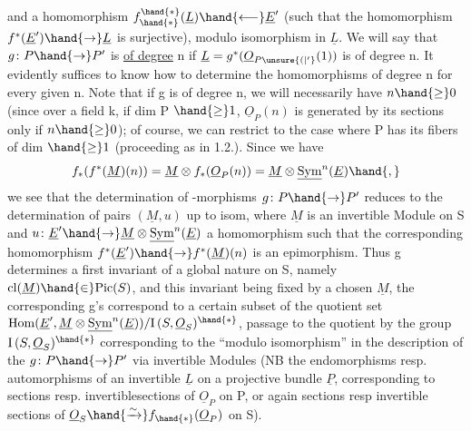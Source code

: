 
and a homomorphism $f^{\hand{*}}_{\hand{*}}(\underline{L}) \hand{\longleftarrow} \underline{E}'$ (such that the  homomorphism
$f^{*}(\underline{E}') \hand{\to} \underline{L}$ is surjective), modulo isomorphism in $\underline{L}$. We will say that
$g\colon P \hand{\to} P'$ is \uline{of degree} n if $\underline{L} = g^{*}(\underline{O}_{P\unsure{(|'}}(1))$ is of degree n. It evidently
suffices to know how to determine the homomorphisms of degree n for every given
n. Note that if g is of degree n, we will necessarily have $n \hand{\geq} 0$
(since over a field k,  if dim P $\hand{\geq} 1$, $\underline{O}_P(n)$ is generated by its
sections only if $n \hand{\geq} 0$); of course, we can  restrict to the case
where P has its fibers of dim $\hand{\geq} 1$ (proceeding as in 1.2.). Since we have
\[ f_{*}(f^{*}(\underline{M})(n)) = \underline{M} \otimes f_{*}(\underline{O}_P(n)) = \underline{M} \otimes \underline{\mathrm{Sym}}^{n}(\underline{E}) \hand{,} \]
we see that the determination of -morphisms $g\colon P \hand{\to} P'$ reduces
to the determination of pairs $(\underline{M},u)$ up to isom, where $\underline{M}$ is an invertible
Module on S and $u\colon \underline{E}' \hand{\to} \underline{M}\otimes\underline{\mathrm{Sym}}^{n}(\underline{E})$ a homomorphism such that
the corresponding homomorphism $f^{*}(\underline{E}') \hand{\to} f^{*}(\underline{M})(n)$ is an epimorphism.
Thus g determines a first invariant of a global nature on S, namely
$\mathrm{cl}(\underline{M}) \hand{\in} \mathrm{Pic}(S)$, and this invariant being fixed by a chosen $\underline{M}$, the corresponding g's
correspond to a certain subset of the quotient set
$\mathrm{Hom}(\underline{E}',\underline{M}\otimes\underline{\mathrm{Sym}}^{n}(\underline{E}))/\mathrm{I}\,(S,\underline{O}_S)^{\hand{*}}$, passage to the quotient by the group
$\mathrm{I}\,(S,\underline{O}_S)^{\hand{*}}$ corresponding to the ``modulo isomorphism'' in the description
of the $g\colon P \hand{\to} P'$ via invertible Modules (NB the endomorphisms resp. automorphisms
of an invertible $\underline{L}$ on a projective bundle $\underline{P}$, corresponding to
sections resp. invertible\hand{/}sections of $\underline{O}_P$ on P, or again sections
resp invertible sections of $\underline{O}_S \hand{\xrightarrow{\sim}} f_{\hand{*}}(\underline{O}_P)$ on S).

